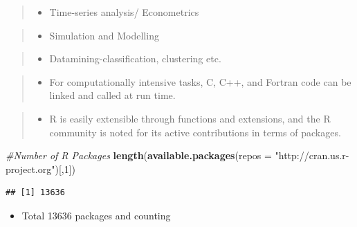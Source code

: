 \documentclass[]{book}
\newenvironment{Shaded}{\begin{snugshade}}{\end{snugshade}}
\newcommand{\KeywordTok}[1]{\textcolor[rgb]{0.13,0.29,0.53}{\textbf{#1}}}
\newcommand{\DataTypeTok}[1]{\textcolor[rgb]{0.13,0.29,0.53}{#1}}
\newcommand{\DecValTok}[1]{\textcolor[rgb]{0.00,0.00,0.81}{#1}}
\newcommand{\StringTok}[1]{\textcolor[rgb]{0.31,0.60,0.02}{#1}}
\newcommand{\CommentTok}[1]{\textcolor[rgb]{0.56,0.35,0.01}{\textit{#1}}}
\newcommand{\NormalTok}[1]{#1}
\providecommand{\tightlist}{%
  \setlength{\itemsep}{0pt}\setlength{\parskip}{0pt}}
\begin{document}
\begin{quote}
\begin{itemize}
\tightlist
\item
  Time-series analysis/ Econometrics
\end{itemize}
\end{quote}

\begin{quote}
\begin{itemize}
\tightlist
\item
  Simulation and Modelling
\end{itemize}
\end{quote}

\begin{quote}
\begin{itemize}
\tightlist
\item
  Datamining-classification, clustering etc.
\end{itemize}
\end{quote}

\begin{quote}
\begin{itemize}
\tightlist
\item
  For computationally intensive tasks, C, C++, and Fortran code can be
  linked and called at run time.
\end{itemize}
\end{quote}

\begin{quote}
\begin{itemize}
\tightlist
\item
  R is easily extensible through functions and extensions, and the R
  community is noted for its active contributions in terms of packages.
\end{itemize}
\end{quote}

\begin{Shaded}
\begin{Highlighting}[]
\CommentTok{#Number of R Packages }
\KeywordTok{length}\NormalTok{(}\KeywordTok{available.packages}\NormalTok{(}\DataTypeTok{repos =} \StringTok{"http://cran.us.r-project.org"}\NormalTok{)[,}\DecValTok{1}\NormalTok{])}
\end{Highlighting}
\end{Shaded}

\begin{verbatim}
## [1] 13636
\end{verbatim}

\begin{itemize}
\tightlist
\item
  Total 13636 packages and counting
\end{itemize}
\end{document}
